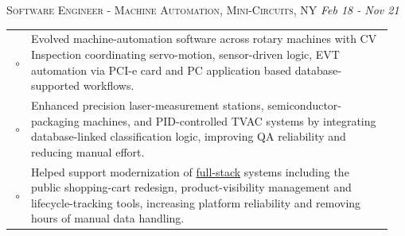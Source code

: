 \documentclass[a4paper]{article}
\newcommand{\SpaceBetweenJobs}{\vspace{-1em}}
\begin{document}
\noindent
\colorbox{gray!15}{
    \parbox[c][0.6em][c]{\linewidth}{
        \faBriefcase\;\textsc{Software Engineer - Machine Automation, Mini-Circuits, NY}
        \hfill \emph{Feb 18 - Nov 21}
    }
}
{\color{previousWork}
\begin{tabular}{r p{0.95\linewidth}}
$\circ$	&	{\fontspec{Inter}	Evolved machine-automation software across rotary machines with CV Inspection coordinating servo-motion, sensor-driven logic, EVT automation via PCI-e card and PC application based database-supported workflows.	}	\\
$\circ$	&	{\fontspec{Inter}	Enhanced precision laser-measurement stations, semiconductor-packaging machines, and PID-controlled TVAC systems by integrating database-linked classification logic, improving QA reliability and reducing manual effort.	}	\\
$\circ$	&	{\fontspec{Inter}	Helped support modernization of \underline{full-stack} systems including the public shopping-cart redesign, product-visibility management and lifecycle-tracking tools, increasing platform reliability and removing hours of manual data handling.	}	\\
\end{tabular}
}

\SpaceBetweenJobs
\end{document}
